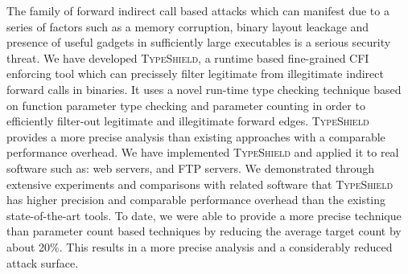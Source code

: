 The family of forward indirect call based attacks which can manifest due to a series of factors such as
a memory corruption, binary layout leackage and presence of useful
gadgets in sufficiently large executables is a serious security threat.
We have developed \textsc{TypeShield}, a runtime based fine-grained CFI enforcing
tool which can precissely filter legitimate from illegitimate indirect forward
calls in binaries.
It uses a novel run-time type checking technique based on function parameter
type checking and parameter counting in order to efficiently filter-out legitimate
and illegitimate forward edges.
\textsc{TypeShield} provides a more precise analysis than existing approaches with a
comparable performance overhead.
We have implemented \textsc{TypeShield} and applied it to real software such as:
web servers, and FTP servers.
We demonstrated through extensive experiments and comparisons with related software
that \textsc{TypeShield} has higher precision and comparable performance overhead than 
the existing state-of-the-art tools. To date, we were able to provide a more precise
technique than parameter count based techniques
by reducing the average target count by about 20\%. This results in a more precise 
analysis and a considerably reduced attack surface.


